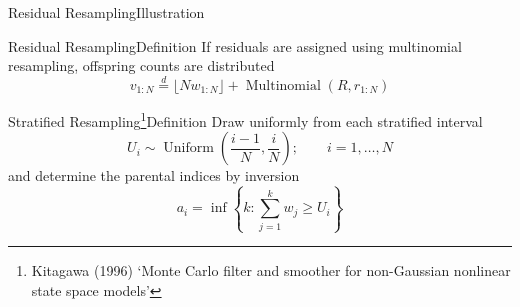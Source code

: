 \documentclass[aspectratio=169]{beamer}
\theoremstyle{definition}
\newcommand{\eqdist}{\overset{d}{=}}
\newcommand{\Unif}{\operatorname{Uniform}}
\newcommand{\Mn}{\operatorname{Multinomial}}
\newcommand{\vt}[1]{v_{#1}}
\newcommand{\wt}[1]{w_{#1}}
\begin{document}
\begin{frame}{Residual Resampling}{Illustration}
\end{frame}


\begin{frame}{Residual Resampling}{Definition}
If residuals are assigned using multinomial resampling, offspring counts are distributed
\begin{equation*}
\vt{1:N} \eqdist \lfloor N \wt{1:N} \rfloor +  \Mn(R, r_{1:N})
\end{equation*}
\end{frame}


\begin{frame}{Stratified Resampling\footnote{Kitagawa (1996) `Monte Carlo filter and smoother for non-Gaussian nonlinear state space models'}}{Definition}
Draw uniformly from each stratified interval
\begin{equation*}
U_i \sim \Unif \left(\frac{i-1}{N}, \frac{i}{N} \right); \qquad i=1,\dots,N
\end{equation*}
and determine the parental indices by inversion
\begin{equation*}
a_i = \inf\left\{ k: \sum_{j=1}^{k} \wt{j} \geq U_i \right\}
\end{equation*}
\end{frame}
\end{document}
